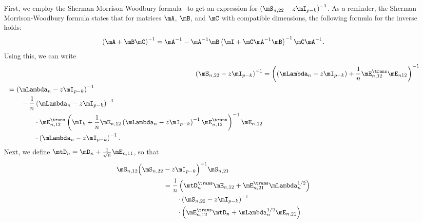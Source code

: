 First, we employ the Sherman-Morrison-Woodbury formula~\cite{golub1996mc} to  get an expression for $\left(\mS_{n,22} - z \mI_{p-k}\right)^{-1}$.  As a reminder, the Sherman-Morrison-Woodbury formula states that for matrices $\mA$, $\mB$, and $\mC$ with compatible dimensions, the following formula for the inverse holds:
\[
    \left(
        \mA
        +
        \mB
        \mC
    \right)^{-1}
        =
        \mA^{-1}
        -
        \mA^{-1}
        \mB
        \left(
            \mI
            +
            \mC
            \mA^{-1}
            \mB
        \right)^{-1}
        \mC
        \mA^{-1}.
\]
Using this, we can write
\begin{align}\label{E:lowrank-smw-expansion}
    \left(
        \mS_{n,22} - z \mI_{p-k}
    \right)^{-1}
        &=
            \left(
                \left(
                    \mLambda_n - z \mI_{p-k}
                \right)
                +
                \frac{1}{n}
                \mE_{n,12}^\trans \mE_{n12}
            \right)^{-1} \notag \\
        \begin{split}
        &=
            \left(
                \mLambda_n
                -
                z
                \mI_{p-k}
            \right)^{-1} \\
            &\qquad-
            \frac{1}{n}
            \left(
                \mLambda_n
                -
                z
                \mI_{p-k}
            \right)^{-1} \\
            &\qquad\qquad\cdot
            \mE_{n,12}^\trans
            \left(
                \mI_k
                +
                \frac{1}{n}
                \mE_{n,12}
                \left(
                    \mLambda_n
                    -
                    z
                    \mI_{p-k}
                \right)^{-1}
                \mE_{n,12}^\trans
            \right)^{-1}
            \mE_{n,12} \\
            &\qquad\qquad\cdot
            \left(
                \mLambda_n
                -
                z
                \mI_{p-k}
            \right)^{-1}.
    \end{split}
\end{align}
Next, we define $\mtD_n = \mD_n + \frac{1}{\sqrt{n}} \mE_{n,11}$, so that
\begin{align}\label{E:lowrank-S-schur}
    \begin{split}
    \mS_{n,12} 
    \Big(
        \mS_{n,22} &- z \mI_{p-k}
    \Big)^{-1}
    \mS_{n,21} \\
        &=
            \frac{1}{n}
            \left(
                \mtD_n^\trans \mE_{n,12}
                +
                \mE_{n,21}^\trans \mLambda_n^{1/2}
            \right) \\
            &\qquad\cdot
            \left(
                \mS_{n,22} - z \mI_{p-k}
            \right)^{-1} \\
            &\qquad\cdot
            \left(
                \mE_{n,12}^\trans \mtD_n
                +
                \mLambda_n^{1/2} \mE_{n,21}
            \right).
    \end{split}
\end{align}

